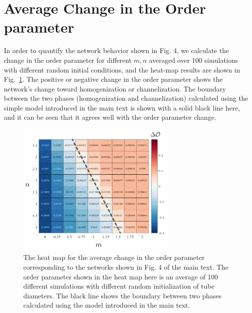 \documentclass[%
 amsmath,amssymb,
prstper,
]{revtex4-2}
\begin{document}
\section{Average Change in the  Order parameter}
%
In order to quantify the network behavior shown in Fig. 4, we calculate the change in the order parameter for different $m,n$ averaged over 100 simulations with different random initial conditions, and the heat-map results are shown in Fig.~\ref{fig:fig4_SI-2}. The positive or negative change in the order parameter shows the network's change toward homogenization or channelization. The boundary between the two phases (homogenization and channelization) calculated using the simple model introduced in the main text is shown with a solid black line here, and it can be seen that it agrees well with the order parameter change. 
%
\begin{figure}[htp]
    \includegraphics[width = 0.70\textwidth]{FigS5.pdf}
    \caption{The heat map for the average change in the order parameter corresponding to the networks shown in Fig. 4 of the main text. The order parameter shown in the heat map here is an average of 100 different simulations with different random initialization of tube diameters. The black line shows the boundary between two phases calculated using the model introduced in the main text.}\label{fig:fig4_SI-2}
\end{figure}
\end{document}
